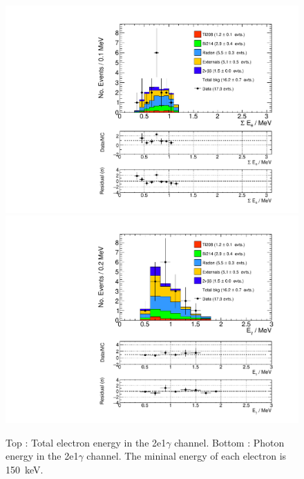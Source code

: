\documentclass[main.tex]{subfiles}
\begin{document}
\begin{figure} [h!]
\begin{center}
\includegraphics[scale=0.5]{pictures/FinalResults/bb2nu2/150/SEe_bb2nu2NS.pdf}
\includegraphics[scale=0.5]{pictures/FinalResults/bb2nu2/150/Eg_bb2nu2NS.pdf}
\end{center}
\caption{Top : Total electron energy in the 2e1$\gamma$ channel. Bottom : Photon energy in the 2e1$\gamma$ channel. The mininal energy of each electron is 150~keV.}
\label{plot:SEeAndEg250bb2nu2_150}
\end{figure}
\end{document}
